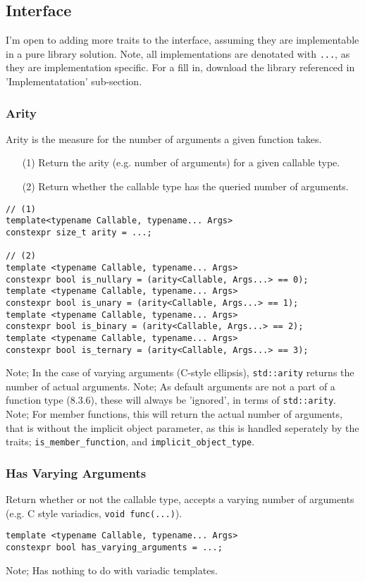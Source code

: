 \subsection{Interface}
I'm open to adding more traits to the interface, assuming they are implementable
in a pure library solution.
\newline
Note, all implementations are denotated with \verb|...|, as they are
implementation specific. For a fill in, download the library referenced in
'Implementatation' sub-section.
\subsubsection{Arity}
Arity is the measure for the number of arguments a given function takes.
\begin{itemize}
\item[(1)] Return the arity (e.g. number of arguments) for a given callable type.
\item[(2)] Return whether the callable type has the queried number of arguments.
\end{itemize}
\begin{verbatim}
// (1)
template<typename Callable, typename... Args>
constexpr size_t arity = ...;

// (2)
template <typename Callable, typename... Args>
constexpr bool is_nullary = (arity<Callable, Args...> == 0);
template <typename Callable, typename... Args>
constexpr bool is_unary = (arity<Callable, Args...> == 1);
template <typename Callable, typename... Args>
constexpr bool is_binary = (arity<Callable, Args...> == 2);
template <typename Callable, typename... Args>
constexpr bool is_ternary = (arity<Callable, Args...> == 3);
\end{verbatim}
Note; In the case of varying arguments (C-style ellipsis), \verb|std::arity| returns the
number of actual arguments.
\newline
Note; As default arguments are not a part of a function type (8.3.6), these will
always be 'ignored', in terms of \verb|std::arity|.
\newline
Note; For member functions, this will return the actual number of arguments, 
that is without the implicit object parameter, as this is handled seperately by
the traits; \verb|is_member_function|, and \verb|implicit_object_type|.

\subsubsection{Has Varying Arguments}
Return whether or not the callable type, accepts a varying number of arguments
(e.g. C style variadics, \verb|void func(...)|).
\begin{verbatim}
template <typename Callable, typename... Args>
constexpr bool has_varying_arguments = ...;
\end{verbatim}
Note; Has nothing to do with variadic templates.

